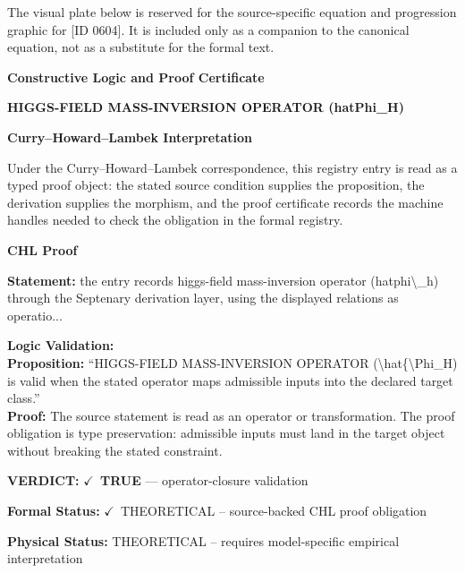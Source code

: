 \begingroup\footnotesize\sloppy
The visual plate below is reserved for the source-specific equation and progression graphic for [ID 0604]. It is included only as a companion to the canonical equation, not as a substitute for the formal text.
\par\endgroup
\ifTZPDarkEdition
{}
\fi

\clearpage
\begingroup\tzpsupportsetup
\noindent\textbf{\fontsize{10.8pt}{12.8pt}\selectfont [ID 0604] Constructive Logic and Proof Certificate}\par
\noindent\textbf{\fontsize{10pt}{12pt}\selectfont HIGGS-FIELD MASS-INVERSION OPERATOR (hatPhi\_H)}\par
\vspace{0.45em}
\begingroup
\footnotesize
\setlength{\parskip}{0.22em}
\setlength{\parindent}{0pt}
\noindent\textbf{Curry--Howard--Lambek Interpretation}\par
Under the Curry--Howard--Lambek correspondence, this registry entry is read as a typed proof
object: the stated source condition supplies the proposition, the derivation supplies the
morphism, and the proof certificate records the machine handles needed to check the obligation
in the formal registry.

\vspace{0.45em}
\noindent\textbf{CHL Proof}\par
\textbf{Statement:} the entry records higgs-field mass-inversion operator (hatphi\textbackslash{}\_h) through the Septenary
derivation layer, using the displayed relations as operatio...

\textbf{Logic Validation:}\\
\textbf{Proposition:} ``HIGGS-FIELD MASS-INVERSION OPERATOR (\textbackslash{}hat\{\textbackslash{}Phi\_H) is valid when the stated operator
maps admissible inputs into the declared target class.''\\
\textbf{Proof:} The source statement is read as an operator or transformation. The proof obligation is
type preservation: admissible inputs must land in the target object without breaking the
stated constraint.

\textbf{VERDICT:} \ensuremath{\checkmark}\ \textbf{TRUE} --- operator-closure validation

\textbf{Formal Status:} \ensuremath{\checkmark}\ THEORETICAL -- source-backed CHL proof obligation

\textbf{Physical Status:} THEORETICAL -- requires model-specific empirical interpretation
\par\vspace{0.45em}
\par
\ifTZPDarkEdition
{}
\fi
\endgroup
\endgroup
